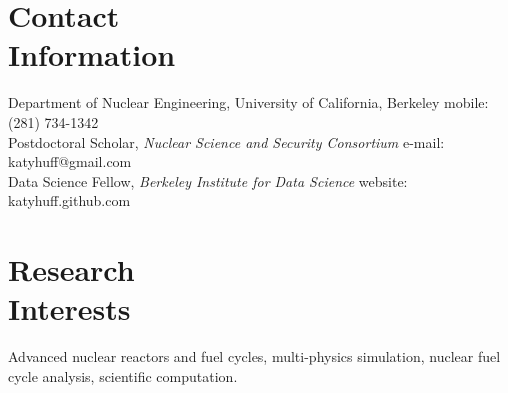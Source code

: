 \documentclass[margin,line]{resume}
\begin{document}
\begin{resume}


    \section{\mysidestyle Contact\\Information}

    Department of Nuclear Engineering, University of California, Berkeley       \hfill mobile: (281) 734-1342           \vspace{0mm}\\\vspace{0mm}%
    Postdoctoral Scholar, \textsl{Nuclear Science and Security Consortium}       \hfill e-mail: katyhuff@gmail.com            \vspace{0mm}\\\vspace{0mm}%
    Data Science Fellow, \textsl{Berkeley Institute for Data Science}           \hfill website: katyhuff.github.com     \vspace{0mm}\\\vspace{-4.5mm}%

    \section{\mysidestyle Research\\Interests}
		Advanced nuclear reactors and fuel cycles, multi-physics
                simulation, nuclear fuel cycle analysis,
                scientific computation.

\end{resume}
\end{document}
